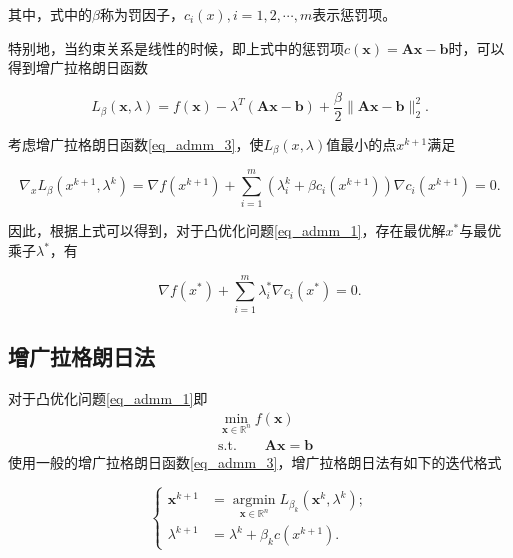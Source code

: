 其中，式中的$\beta$称为罚因子，$c_{i}(x), i=1, 2, \cdots, m$表示惩罚项。

特别地，当约束关系是线性的时候，即上式中的惩罚项$c(\bm{x})=\bm{Ax}-\bm{b}$时，可以得到增广拉格朗日函数

\begin{equation}\label{eq_admm_4}
    L_{\beta}(\bm{x}, \lambda) = f(\bm{x}) - \lambda^{T}(\bm{Ax}-\bm{b})+\frac{\beta}{2}\|\bm{Ax}-\bm{b}\|_{2}^{2}.
\end{equation}

考虑增广拉格朗日函数\ref{eq_admm_3}，使$L_{\beta}(x, \lambda)$值最小的点$x^{k+1}$满足\cite{2016ADMM}

\begin{equation*}
    \nabla_{x} L_{\beta}(x^{k+1}, \lambda^{k}) = \nabla f(x^{k+1}) + \sum_{i=1}^{m} (\lambda_{i}^{k}+\beta c_{i}(x^{k+1})) \nabla c_{i}(x^{k+1}) = 0.
\end{equation*}

因此，根据上式可以得到，对于凸优化问题\ref{eq_admm_1}，存在最优解$x^{*}$与最优乘子$\lambda^{*}$，有

\begin{equation}
    \nabla f(x^{*}) + \sum_{i=1}^{m}\lambda_{i}^{*}\nabla c_{i}(x^{*}) = 0.
\end{equation}

\subsection{增广拉格朗日法}

对于凸优化问题\ref{eq_admm_1}即
\begin{equation*}
    \begin{split}
        &\min\limits_{\bm{x}\in \mathbb{R}^{n}} f(\bm{x}) \\
        &\mathrm{s. t.} \quad\quad \bm{Ax} = \bm{b}
    \end{split}
\end{equation*}
使用一般的增广拉格朗日函数\ref{eq_admm_3}，增广拉格朗日法有如下的迭代格式

\begin{equation}\label{eq_admm_5}
    \begin{cases}
        \bm{x}^{k+1} &= \mathop{\mathrm{argmin}}\limits_{\bm{x}\in \mathbb{R}^{n}} L_{\beta_{k}}(\bm{x}^{k}, \lambda^{k}) ; \\
        \lambda^{k+1} &= \lambda^{k} + \beta_{k} c(x^{k+1}) .
    \end{cases}
\end{equation}

